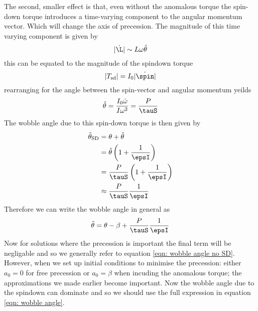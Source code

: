 The second, smaller effect is that, even without the anomalous torque the spin-down 
torque introduces a time-varying component to the angular momentum vector. Which
will change the axis of precession. The magnitude of this time
varying component is given by 
\begin{equation}
|\dot{\L}| \sim L \omega \hat{\theta}
\end{equation} 
this can be equated to the magnitude of the spindown torque
\begin{equation}
|T_{\mathrm{sd}}| = I_{0}|\dot{\spin}|
\end{equation}
rearranging for the angle between the spin-vector and angular momentum yeilds
\begin{equation}
    \hat{\theta} = \frac{I_{0}\dot{\omega}}{I \omega^{2}} = \frac{P}{\tauS}
\end{equation}
The wobble angle due to this spin-down torque is then given by 
\begin{align}
    \wobbleangle_{\mathrm{SD}} & = \theta + \hat{\theta}\\
                 & = \hat{\theta}\left(1 + \frac{1}{\epsI}\right) \\
                 & = \frac{P}{\tauS}\left(1 + \frac{1}{\epsI}\right) \\
                 & \approx \frac{P}{\tauS}{\frac{1}{\epsI}}
    \label{eqn: spindown wobble angle}
\end{align}
Therefore we can write the wobble angle in general as
\begin{equation}
    \wobbleangle = \theta - \beta + \frac{P}{\tauS}\frac{1}{\epsI}
    \label{eqn: wobble angle}
\end{equation}
Now for solutions where the precession is important the final term
will be negligable and so we generally refer to equation \eqref{eqn: wobble angle no SD}.
However, when we set up initial conditions to minimise the precession: either
$a_{0}=0$ for free precession or $a_{0} = \beta$ when incuding the anomalous
torque; the approximations we made earlier become important. Now the wobble angle
due to the spindown can dominate and so we should use the full expression in
equation \eqref{eqn: wobble angle}.
